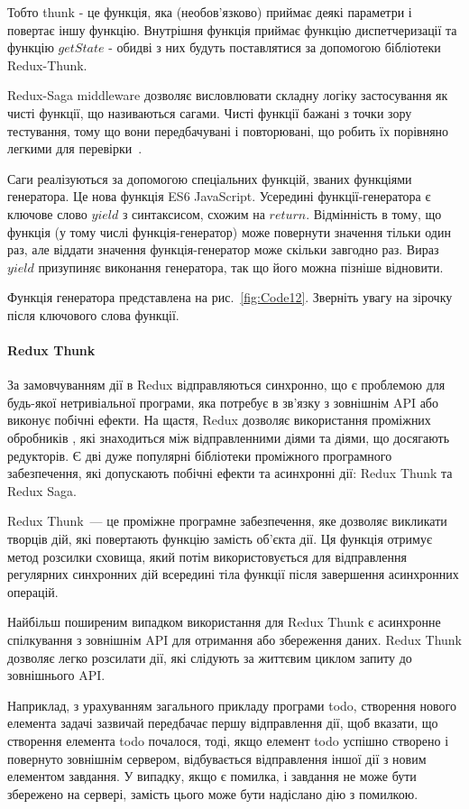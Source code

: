 Тобто thunk - це функція, яка (необов'язково) приймає деякі параметри і повертає іншу функцію. Внутрішня функція приймає функцію диспетчеризації та функцію $getState$ - обидві з них будуть поставлятися за допомогою бібліотеки Redux-Thunk.

Redux-Saga middleware дозволяє висловлювати складну логіку застосування як чисті функції, що називаються сагами. Чисті функції бажані з точки зору тестування, тому що вони передбачувані і повторювані, що робить їх порівняно легкими для перевірки~\cite{hung2018architectural}.

Саги реалізуються за допомогою спеціальних функцій, званих функціями генератора. Це нова функція ES6 JavaScript. Усередині функції-генератора є ключове слово $yield$ з синтаксисом, схожим на $return$. Відмінність в тому, що функція (у тому числі функція-генератор) може повернути значення тільки один раз, але віддати значення функція-генератор може скільки завгодно раз. Вираз $yield$ призупиняє виконання генератора, так що його можна пізніше відновити.

Функція генератора представлена на рис.~\ref{fig:Code12}. Зверніть увагу на зірочку після ключового слова функції.


\paragraph{Redux Thunk}

За замовчуванням дії в Redux відправляються синхронно, що є проблемою для будь-якої нетривіальної програми, яка потребує в зв'язку з зовнішнім API або виконує побічні ефекти. На щастя, Redux дозволяє використання проміжних обробників , які знаходиться між відправленними діями та діями, що досягають редукторів. Є дві дуже популярні бібліотеки проміжного програмного забезпечення, які допускають побічні ефекти та асинхронні дії: Redux Thunk та Redux Saga.

Redux Thunk~--- це проміжне програмне забезпечення, яке дозволяє викликати творців дій, які повертають функцію замість об'єкта дії. Ця функція отримує метод розсилки сховища, який потім використовується для відправлення регулярних синхронних дій всередині тіла функції після завершення асинхронних операцій.

Найбільш поширеним випадком використання для Redux Thunk є асинхронне спілкування з зовнішнім API для отримання або збереження даних. Redux Thunk дозволяє легко розсилати дії, які слідують за життєвим циклом запиту до зовнішнього API.

Наприклад, з урахуванням загального прикладу програми todo, створення нового елемента задачі зазвичай передбачає першу відправлення дії, щоб вказати, що створення елемента todo почалося, тоді, якщо елемент todo успішно створено і повернуто зовнішнім сервером, відбувається відправлення іншої дії з новим елементом завдання. У випадку, якщо є помилка, і завдання не може бути збережено на сервері, замість цього може бути надіслано дію з помилкою.

